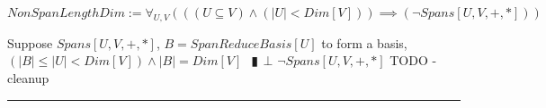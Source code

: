 \documentclass{book}
\newcommand{\abr}{:=}
\newcommand{\pipe}{$\phantom{(}\vrectangleblack\phantom{)}$}
\newcommand{\pr}[1]{\left(#1\right)}
\begin{document}
$NonSpanLengthDim \abr \forall_{U, V}\pr{\pr{(U \subseteq V) \land (|U| < Dim[V])} \implies (\lnot Spans[U, V, +, *])}$
\begin{enumerate}
  \lit Suppose $Spans[U, V, +, *]$, $B = SpanReduceBasis[U]$ to form a basis, $(|B| \leq |U| < Dim[V]) \land |B| = Dim[V]$ \pipe $\bot$
  \lit $\lnot Spans[U, V, +, *]$
  \lit TODO - cleanup
\end{enumerate} \vspace{.75mm} \hrule \vspace{.75mm} \ \\ 

\begin{comment}
  $DimSub \abr \forall_{U, V}\pr{\pr{(FinDim[V, +, *]) \land (Subspace[U, V, +, *])} \implies (Dim[U] \leq Dim[V])}$
  \begin{enumerate}
    \lit TODO ???
  \end{enumerate} \vspace{.75mm} \hrule \vspace{.75mm} \ \\ 

  $DimSum \abr \forall_{U_1, U_2, V}\pr{((FinDim[V, +, *]) \land (Subspace[U_1, V, +, *]) \land (Subspace[U_2, V, +, *])} \\
      \implies (Dim[U_1 + U_2] = Dim[U_1] + Dim[U_2] - Dim[U_1 \cap U_2]))$
  \begin{enumerate}
    \lit TODO
  \end{enumerate} \vspace{.75mm} \hrule \vspace{.75mm} \ \\ 


\end{comment}
\end{document}

